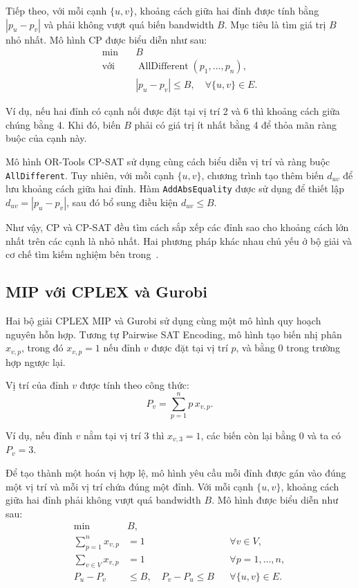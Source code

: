 \documentclass[a4paper,fleqn]{cas-sc}
\newcommand{\code}[1]{\nolinkurl{#1}}
\begin{document}
Tiếp theo, với mỗi cạnh $\{u,v\}$, khoảng cách giữa hai đỉnh được tính bằng $|p_u-p_v|$ và phải không vượt quá biến bandwidth $B$. Mục tiêu là tìm giá trị $B$ nhỏ nhất. Mô hình CP được biểu diễn như sau:
\begin{equation}
\begin{aligned}
\min\quad &B\\
\text{với}\quad
&\operatorname{AllDifferent}(p_1,\ldots,p_n),\\
&|p_u-p_v|\leq B,\quad \forall\{u,v\}\in E.
\end{aligned}
\label{eq:cp}
\end{equation}

Ví dụ, nếu hai đỉnh có cạnh nối được đặt tại vị trí 2 và 6 thì khoảng cách giữa chúng bằng 4. Khi đó, biến $B$ phải có giá trị ít nhất bằng 4 để thỏa mãn ràng buộc của cạnh này.

Mô hình OR-Tools CP-SAT sử dụng cùng cách biểu diễn vị trí và ràng buộc \code{AllDifferent}. Tuy nhiên, với mỗi cạnh $\{u,v\}$, chương trình tạo thêm biến $d_{uv}$ để lưu khoảng cách giữa hai đỉnh. Hàm \code{AddAbsEquality} được sử dụng để thiết lập $d_{uv}=|p_u-p_v|$, sau đó bổ sung điều kiện $d_{uv}\leq B$.

Như vậy, CP và CP-SAT đều tìm cách sắp xếp các đỉnh sao cho khoảng cách lớn nhất trên các cạnh là nhỏ nhất. Hai phương pháp khác nhau chủ yếu ở bộ giải và cơ chế tìm kiếm nghiệm bên trong~\cite{ortools,ibmcp}.

\subsection{MIP với CPLEX và Gurobi}

Hai bộ giải CPLEX MIP và Gurobi sử dụng cùng một mô hình quy hoạch nguyên hỗn hợp. Tương tự Pairwise SAT Encoding, mô hình tạo biến nhị phân $x_{v,p}$, trong đó $x_{v,p}=1$ nếu đỉnh $v$ được đặt tại vị trí $p$, và bằng 0 trong trường hợp ngược lại.

Vị trí của đỉnh $v$ được tính theo công thức:
\[
P_v=\sum_{p=1}^{n}p\,x_{v,p}.
\]

Ví dụ, nếu đỉnh $v$ nằm tại vị trí 3 thì $x_{v,3}=1$, các biến còn lại bằng 0 và ta có $P_v=3$.

Để tạo thành một hoán vị hợp lệ, mô hình yêu cầu mỗi đỉnh được gán vào đúng một vị trí và mỗi vị trí chứa đúng một đỉnh. Với mỗi cạnh $\{u,v\}$, khoảng cách giữa hai đỉnh phải không vượt quá bandwidth $B$. Mô hình được biểu diễn như sau:
\begin{align}
\min\quad &B,\nonumber\\
\sum_{p=1}^{n}x_{v,p}&=1 &&\forall v\in V,\nonumber\\
\sum_{v\in V}x_{v,p}&=1 &&\forall p=1,\ldots,n,\nonumber\\
P_u-P_v&\leq B,\quad P_v-P_u\leq B &&\forall\{u,v\}\in E.
\label{eq:mip}
\end{align}
\end{document}
